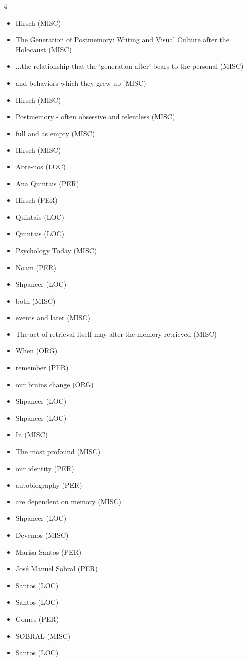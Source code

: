 \documentclass{article}
\begin{document}
\begin{multicols}{4}
\begin{itemize}
\item Hirsch (MISC)
\item The  Generation  of 
Postmemory: Writing and Visual Culture after the Holocaust (MISC)
\item ...the relationship that the ‘generation after’ bears to the 
personal (MISC)
\item and behaviors which they grew up (MISC)
\item Hirsch (MISC)
\item Postmemory - often obsessive and relentless (MISC)
\item full and as empty (MISC)
\item Hirsch (MISC)
\item Abre-nos (LOC)
\item Ana Quintais (PER)
\item Hirsch (PER)
\item Quintais (LOC)
\item Quintais (LOC)
\item Psychology  Today (MISC)
\item Noam (PER)
\item Shpancer (LOC)
\item both (MISC)
\item events and later (MISC)
\item The act of retrieval itself may alter the memory 
retrieved (MISC)
\item When (ORG)
\item remember (PER)
\item our  brains  change (ORG)
\item Shpancer (LOC)
\item Shpancer (LOC)
\item In (MISC)
\item The most profound (MISC)
\item our identity (PER)
\item autobiography (PER)
\item are dependent on memory (MISC)
\item Shpancer (LOC)
\item Devemos (MISC)
\item Marisa Santos (PER)
\item José 
Manuel Sobral (PER)
\item Santos (LOC)
\item Santos (LOC)
\item Gomes (PER)
\item SOBRAL (MISC)
\item Santos (LOC)

\end{itemize}
\end{multicols}
\end{document}
